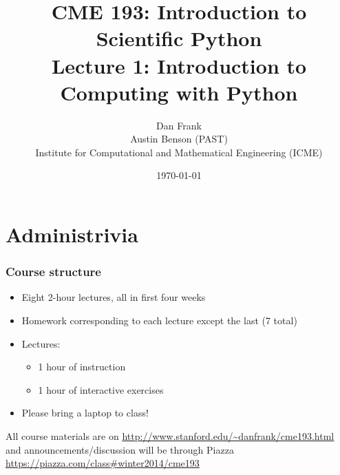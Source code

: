 \documentclass{beamer}
\title{CME 193: Introduction to Scientific Python \\
Lecture 1: Introduction to Computing with Python}
\author{Dan Frank \\
\vspace{0.1in}
 Austin Benson (PAST) \\
\vspace{0.1in}
Institute for Computational and Mathematical Engineering (ICME)}
\date{\today}
\begin{document}
\maketitle

\section{Administrivia}

%
%

\begin{frame}
\frametitle{Course structure}

\begin{itemize}
\setlength{\itemsep}{0.1in}
\item{
Eight 2-hour lectures, all in first four weeks
}

\item{
Homework corresponding to each lecture except the last (7 total)
}

\item{
Lectures:
\begin{itemize}
\setlength{\itemsep}{0.05in}
\item{1 hour of instruction}
\item{1 hour of interactive exercises}
\end{itemize}
}

\item{
Please bring a laptop to class!
}
\end{itemize}

\vspace{0.1in}

All course materials are on \url{http://www.stanford.edu/~danfrank/cme193.html} and
announcements/discussion will be through Piazza 
\url{https://piazza.com/class\#winter2014/cme193} 

\end{frame}
\end{document}
